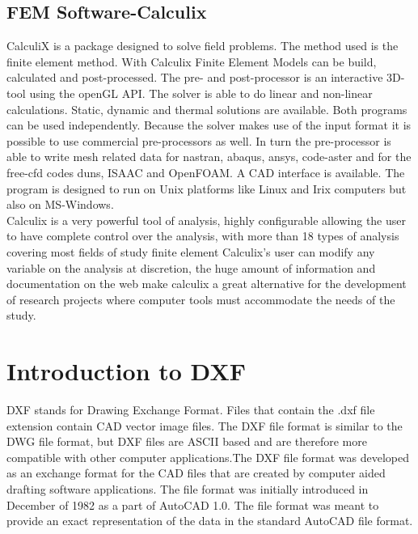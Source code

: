 \subsection{FEM Software-Calculix}
CalculiX is a package designed to solve field problems. The method used is the finite element method.
With Calculix Finite Element Models can be build, calculated and post-processed. The pre- and post-processor is an interactive 3D-tool using the openGL API. The solver is able to do linear and non-linear calculations. Static, dynamic and thermal solutions are available. Both programs can be used independently. Because the solver makes use of the input format it is possible to use commercial pre-processors as well. In turn the pre-processor is able to write mesh related data for nastran, abaqus, ansys, code-aster and for the free-cfd codes duns, ISAAC and OpenFOAM. A CAD interface is available. The program is designed to run on Unix platforms like Linux and Irix computers but also on MS-Windows.\\
Calculix is a very powerful tool of analysis, highly configurable allowing the user to have complete control over the analysis, with more than 18 types of analysis covering most fields of study finite element Calculix's user can modify any variable on the analysis at discretion, the huge amount of information and documentation on the web make calculix a great alternative for the development of research projects where computer tools must accommodate the needs of the study.
\section{Introduction to DXF}
DXF stands for Drawing Exchange Format. Files that contain the .dxf file extension contain CAD vector image files.
The DXF file format is similar to the DWG file format, but DXF files are ASCII based and are therefore more compatible with other computer applications.The DXF file format was developed as an exchange format for the CAD files that are created by computer aided drafting software applications. The file format was initially introduced in December of 1982 as a part of AutoCAD 1.0. The file format was meant to provide an exact representation of the data in the standard AutoCAD file format.
